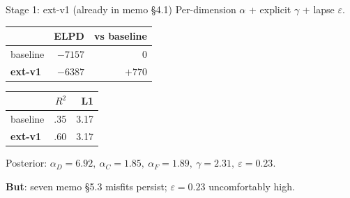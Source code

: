 \documentclass[10pt,aspectratio=169]{beamer}
\newcommand{\main}[1]{\textcolor{CSP-main-dark}{\textbf{#1}}}
\newcommand{\emp}[1]{\textcolor{CSP-emphasis}{\textbf{#1}}}
\begin{document}
\begin{frame}{Stage 1: ext-v1 (already in memo \S4.1)}
Per-dimension $\alpha$ + explicit $\gamma$ + lapse $\varepsilon$.

\vspace{0.5em}
\begin{center}
\begin{tabular}{lrr}
\toprule
& ELPD & vs baseline\\
\midrule
baseline & $-7157$ & 0 \\
\main{ext-v1}  & \main{$-6387$} & \main{$+770$} \\
\bottomrule
\end{tabular}
\quad
\begin{tabular}{lrr}
\toprule
& $R^2$ & L1\\
\midrule
baseline & .35 & 3.17 \\
\main{ext-v1}  & .60 & 3.17 \\
\bottomrule
\end{tabular}
\end{center}

\vspace{0.5em}
Posterior: $\alpha_D = 6.92,\ \alpha_C = 1.85,\ \alpha_F = 1.89,\ \gamma = 2.31,\ \varepsilon = 0.23$.

\vspace{0.5em}
\emp{But}: seven memo \S5.3 misfits persist; $\varepsilon = 0.23$ uncomfortably high.
\end{frame}
\end{document}

